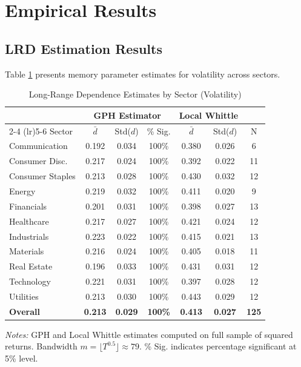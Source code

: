 \documentclass[12pt,a4paper]{article}
\begin{document}
\section{Empirical Results}
\label{sec:results}

\subsection{LRD Estimation Results}

Table \ref{tab:lrd_estimates} presents memory parameter estimates for volatility across sectors.

\begin{table}[H]
\centering
\caption{Long-Range Dependence Estimates by Sector (Volatility)}
\label{tab:lrd_estimates}
\small
\begin{tabular}{lcccccc}
\toprule
 & \multicolumn{3}{c}{GPH Estimator} & \multicolumn{2}{c}{Local Whittle} & \\
\cmidrule(lr){2-4} \cmidrule(lr){5-6}
Sector & $\bar{d}$ & Std($d$) & \% Sig. & $\bar{d}$ & Std($d$) & N \\
\midrule
Communication & 0.192 & 0.034 & 100\% & 0.380 & 0.026 & 6 \\
Consumer Disc. & 0.217 & 0.024 & 100\% & 0.392 & 0.022 & 11 \\
Consumer Staples & 0.213 & 0.028 & 100\% & 0.430 & 0.032 & 12 \\
Energy & 0.219 & 0.032 & 100\% & 0.411 & 0.020 & 9 \\
Financials & 0.201 & 0.031 & 100\% & 0.398 & 0.027 & 13 \\
Healthcare & 0.217 & 0.027 & 100\% & 0.421 & 0.024 & 12 \\
Industrials & 0.223 & 0.022 & 100\% & 0.415 & 0.021 & 13 \\
Materials & 0.216 & 0.024 & 100\% & 0.405 & 0.018 & 11 \\
Real Estate & 0.196 & 0.033 & 100\% & 0.431 & 0.031 & 12 \\
Technology & 0.221 & 0.031 & 100\% & 0.397 & 0.028 & 12 \\
Utilities & 0.213 & 0.030 & 100\% & 0.443 & 0.029 & 12 \\
\midrule
\textbf{Overall} & \textbf{0.213} & \textbf{0.029} & \textbf{100\%} & \textbf{0.413} & \textbf{0.027} & \textbf{125} \\
\bottomrule
\end{tabular}
\begin{tablenotes}\small
\item \textit{Notes:} GPH and Local Whittle estimates computed on full sample of squared returns. Bandwidth $m = \lfloor T^{0.5} \rfloor \approx 79$. \% Sig. indicates percentage significant at 5\% level.
\end{tablenotes}
\end{table}
\end{document}
